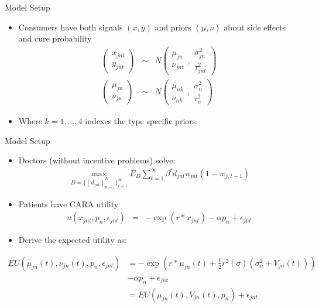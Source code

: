 \documentclass[aspectratio=169,11pt]{beamer}
\begin{document}
\begin{frame}{Model Setup}
\begin{itemize}
\item Consumers have both signals $(x,y)$ and priors $(\mu,\nu)$ about side effects and cure probability
\begin{eqnarray*}
\left( \begin{smallmatrix} x_{jnt} \\ y_{jnt} \end{smallmatrix} \right)
&\sim& N \left( \begin{smallmatrix} \mu_{jn} \\ \nu_{jnt} \end{smallmatrix}, \begin{smallmatrix} \sigma^2_{jn} \\ \tau_{jnt}^2 \end{smallmatrix} \right) \\
\left( \begin{smallmatrix} \mu_{jn} \\ \nu_{jn} \end{smallmatrix} \right)
&\sim& N \left( \begin{smallmatrix} \overline{\mu}_{nk} \\ \overline{\nu}_{nk} \end{smallmatrix}, \begin{smallmatrix} \overline{\sigma}^2_{n} \\ \overline{\tau}_{n}^2 \end{smallmatrix} \right)
\end{eqnarray*}
\item Where $k=1,\ldots,4$ indexes the \alert{type specific priors}. 
\end{itemize}
\end{frame}

\begin{frame}{Model Setup}
\begin{itemize}
\item Doctors (without incentive problems) solve:
\begin{eqnarray*}
\max_{D=\{(d_{jnt})_{n=1}^N \}_{t=1}^{\infty}} E_D \sum_{t=1}^{\infty} \beta^t d_{jnt} u_{jnt}(1 - w_{j,t-1})
\end{eqnarray*}
\item Patients have CARA utility
\begin{eqnarray*}
u(x_{jnt},p_n,\epsilon_{jnt}) &=& -\exp(r *x_{jnt}) - \alpha p_n + \epsilon_{jnt}
\end{eqnarray*}
\item Derive the expected utility as:
\end{itemize}
\vspace{-0.5cm}
\begin{align*}
\tilde{EU}(\mu_{jn}(t),\nu_{jn}(t), p_n,\epsilon_{jnt}) &= -\exp(r *\mu_{jn}(t) + \frac{1}{2} r^2(\sigma) (\sigma^2_n + V_{jn}(t))) \\
& - \alpha p_n + \epsilon_{jnt}\\
&= EU(\mu_{jn}(t),V_{jn}(t),p_n) + \epsilon_{jnt}
\end{align*}
\end{frame}
\end{document}
